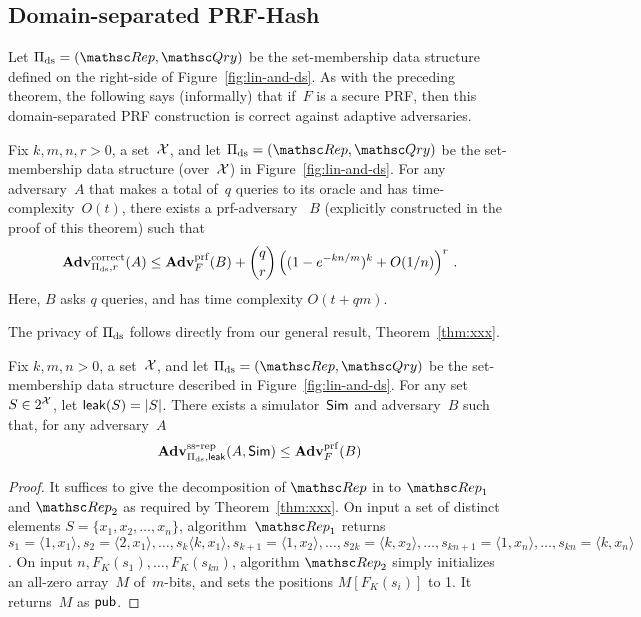 \subsection{Domain-separated PRF-Hash}
Let $\setprim_{\mathrm{ds}}= (\Rep, \Qry)$ be the set-membership data
structure defined on the right-side of Figure~\ref{fig:lin-and-ds}.
As with the preceding theorem, the following says (informally) that
if~$F$ is a secure PRF, then this domain-separated PRF construction is
correct against adaptive adversaries.

\begin{theorem}\label{thm2}\label{thm:ds-correctness}
Fix $k,m,n,r>0$, a set~${\cal X}$, and let $\setprim_{\mathrm{ds}}= (\Rep, \Qry)$ be the set-membership data structure (over~${\cal X}$) in Figure~\ref{fig:lin-and-ds}.  For any adversary~$A$ that makes a total of~$q$ queries to its oracle and has time-complexity~$O(t)$, there exists a prf-adversary ~$B$ (explicitly constructed in the proof of this theorem) such that
\[
\mathrm{\mathbf{Adv}}^{\mathrm{correct}}_{\Pi_{\mathrm{ds}},r}(A) \leq  \mathbf{Adv}^{\mathrm{prf}}_{F}(B)  + {\dbinom{q}{r}} \left( (1-e^{-kn/m})^k + O(1/n) \right)^r\,.
\]
Here, $B$ asks $q$ queries, and has time complexity $O(t+qm)$.
\end{theorem}

The privacy of $\Pi_{\mathrm{ds}}$ follows directly from our general result, Theorem~\ref{thm:xxx}.
\begin{theorem}\label{thm:ds-ss}
Fix $k,m,n>0$, a set~${\cal X}$, and let $\setprim_{\mathrm{ds}}= (\Rep, \Qry)$ be the set-membership data structure described in Figure~\ref{fig:lin-and-ds}.  For any set~$S \in 2^{\cal X}$, let ${\sf leak}(S)=|S|$.  There exists a simulator~${\sf Sim}$ and adversary~$B$ such that, for any adversary~$A$
\[
\mathrm{\mathbf{Adv}}^{\mathrm{ss\mbox{-}rep}}_{\Pi_{\mathrm{ds}},{\sf leak}}(A,{\sf Sim}) \leq  \mathbf{Adv}^{\mathrm{prf}}_{F}(B)
\]
\end{theorem}
\begin{proof}
It suffices to give the decomposition of $\Rep$ in to $\Rep_1$ and $\Rep_2$ as required by Theorem~\ref{thm:xxx}.
On input a set of distinct elements $S=\{x_1,x_2,\ldots,x_n\}$, algorithm~$\Rep_1$ returns $s_1=\langle 1,x_1 \rangle, s_2=\langle 2,x_1 \rangle, \ldots, s_k\langle k,x_1\rangle, s_{k+1}=\langle 1,x_2\rangle, \ldots, s_{2k}=\langle k,x_2\rangle, \ldots ,s_{kn+1}=\langle 1,x_n\rangle, \ldots, s_{kn}=\langle k,x_n \rangle$.  On input $n,F_K(s_1),\ldots,F_K(s_{kn})$, algorithm $\Rep_2$ simply initializes an all-zero array~$M$ of~$m$-bits, and sets the positions $M[F_K(s_i)]$ to 1.  It returns~$M$ as ${\sf pub}$.
\end{proof}


